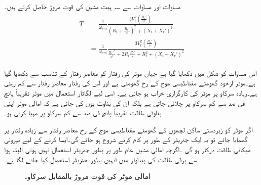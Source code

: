 مساوات   اور مساوات  سے  سہ ہیت مشین کی قوت مروڑ حاصل کرتے ہیں۔
\begin{gather}
\begin{aligned}\label{مساوات_امالی_تین_دور_مروڑ_الف}
T&=\frac{1}{\omega_{sm}} \frac{3 V_t^2 \left(\frac{R_r'}{s} \right)}{\left(R_t+\frac{R_r'}{s} \right)^2+\left(X_t+X_r' \right)^2}\\
&=\frac{1}{\omega_{sm}} \frac{3 V_t^2 \left(\frac{R_r'}{s} \right)}{\frac{R_r'^2}{s^2}+2 R_t \frac{R_r'}{s}+R_t^2+\left(X_t+X_r' \right)^2}
\end{aligned}
\end{gather}

اس مساوات کو شکل   میں دکھایا گیا ہے جہاں موٹر کی رفتار کو معاصر رفتار کے تناسب سے دکھایا گیا ہے۔موٹر ازخود گھومتے مقناطیسی موج کے رخ گھومتی ہے اور اس کی رفتار معاصر رفتار سے  کم رہتی ہے۔زیادہ سرکاو پر موٹر کی کارگزاری  خراب ہو جاتی ہے۔ اسی لیے  لگاتار استعمال میں موٹر  تقریباً پانچ فی صد سے کم سرکاو پر چلائی جاتی ہے بلکہ ان کی بناوٹ یوں کی جاتی ہے کہ امالی موٹر اپنی بناوٹی طاقت تقریباً پانچ فی صد سے کم سرکاو پر مہیا کرتی ہو۔ 

اگر موٹر کو زبردستی ساکن لچھوں کے گھومتے مقناطیسی موج کے رخ معاصر رفتار سے زیادہ رفتار پر گھمایا جائے تو یہ ایک جنریٹر کے طور پر کام کرنے شروع ہو جائے گی۔ایسا کرنے کے لیے بیرونی میکانی طاقت درکار ہو گی ۔اگرچہ امالی مشین عام طور پر بطور جنریٹر استعمال نہیں ہوتی البتہ ہوا سے برقی طاقت کی پیداوار میں انہیں بطور جنریٹر  استعمال کیا جانے لگا ہے۔
\begin{figure}
\centering
\caption{امالی موٹر کی قوت مروڑ بالمقابل سرکاو۔}
\label{شکل_امالی_مروڑ_بالمقابل_رفتار}
\end{figure}

